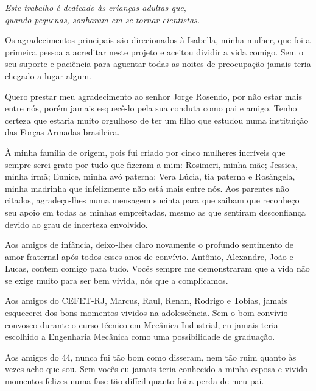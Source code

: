 \begin{dedicatoria}
   \vspace*{\fill}
   \centering
   \noindent
   \textit{ Este trabalho é dedicado às crianças adultas que,\\
   quando pequenas, sonharam em se tornar cientistas.} \vspace*{\fill}
\end{dedicatoria}

\begin{agradecimentos}
Os agradecimentos principais são direcionados à Isabella, minha mulher, que foi a primeira pessoa a acreditar neste projeto e aceitou dividir a vida comigo. Sem o seu suporte e paciência para aguentar todas as noites de preocupação jamais teria chegado a lugar algum.

Quero prestar meu agradecimento ao senhor Jorge Rosendo, por não estar mais entre nós, porém jamais esquecê-lo pela sua conduta como pai e amigo. Tenho certeza que estaria muito orgulhoso de ter um filho que estudou numa instituição das Forças Armadas brasileira.

À minha família de origem, pois fui criado por cinco mulheres incríveis que sempre serei grato por tudo que fizeram a mim: Rosimeri, minha mãe; Jessica, minha irmã; Eunice, minha avó paterna; Vera Lúcia, tia paterna e Rosängela, minha madrinha que infelizmente não está mais entre nós. Aos parentes não citados, agradeço-lhes numa mensagem sucinta para que saibam que reconheço seu apoio em todas as minhas empreitadas, mesmo as que sentiram desconfiança devido ao grau de incerteza envolvido.

Aos amigos de infância, deixo-lhes claro novamente o profundo sentimento de amor fraternal após todos esses anos de convívio. Antônio, Alexandre, João e Lucas, contem comigo para tudo. Vocês sempre me demonstraram que a vida não se exige muito para ser bem vivida, nós que a complicamos.

Aos amigos do CEFET-RJ, Marcus, Raul, Renan, Rodrigo e Tobias, jamais esquecerei dos bons momentos vividos na adolescência. Sem o bom convívio convosco durante o curso técnico em Mecânica Industrial, eu jamais teria escolhido a Engenharia Mecânica como uma possibilidade de graduação.

Aos amigos do 44, nunca fui tão bom como disseram, nem tão ruim quanto às vezes acho que sou. Sem vocês eu jamais teria conhecido a minha esposa e vivido momentos felizes numa fase tão difícil quanto foi a perda de meu pai.


\end{agradecimentos}
